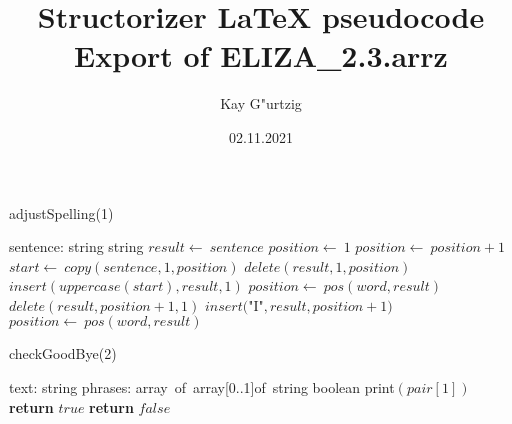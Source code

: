 \documentclass[a4paper,10pt]{article}
\title{Structorizer LaTeX pseudocode Export of ELIZA\_2.3.arrz}
\author{Kay G"urtzig}
\date{02.11.2021}
\begin{document}
\begin{algorithm}
\caption{adjustSpelling(1)}
\begin{algorithmic}[5]
\State {}
    \State sentence: string
  \EndDecl
    \State string
  \EndDecl
  \State \(result\gets\ sentence\)
  \State \(position\gets\ 1\)
    \State \(position\gets\ position+1\)
  \EndWhile
    \State \(start\gets\ copy(sentence,1,position)\)
    \State \(delete(result,1,position)\)
    \State \(insert(uppercase(start),result,1)\)
  \EndIf
    \State \(position\gets\ pos(word,result)\)
      \State \(delete(result,position+1,1)\)
      \State \(insert(\)"{}I"{}\(,result,position+1)\)
      \State \(position\gets\ pos(word,result)\)
    \EndWhile
  \EndFor
\EndFunction
\end{algorithmic}
\end{algorithm}


\begin{algorithm}
\caption{checkGoodBye(2)}
\begin{algorithmic}[5]
\State {}
\State {}
\State {}
\State {}
    \State text: string
    \State phrases: array\ of\ array[0..1]of\ string
  \EndDecl
    \State boolean
  \EndDecl
      \State \(\)print\((pair[1])\)
      \State \textbf{return} \(true\)
    \EndIf
  \EndFor
  \State \textbf{return} \(false\)
\EndFunction
\end{algorithmic}
\end{algorithm}
\end{document}
